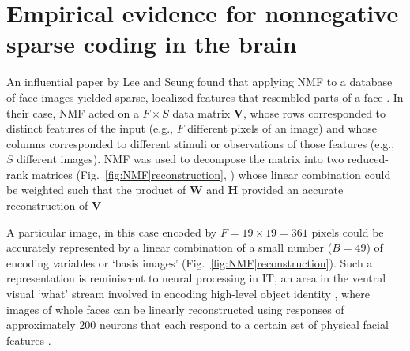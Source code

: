 \section*{Empirical evidence for nonnegative sparse coding in the brain}


An influential paper by Lee and Seung \cite{LeeSeung1999}
found that applying \ac{NMF} to a database of face images
yielded sparse, localized features that resembled parts of a face
.
In their case, \ac{NMF} acted on a
$F \times S$ data matrix \textbf{V},
whose rows corresponded to distinct features of the input 
(e.g., $F$ different pixels of an image)
and whose columns corresponded to different stimuli or 
observations of those features
(e.g., $S$ different images).
\ac{NMF} was used to decompose the matrix into two reduced-rank matrices
(Fig.~\ref{fig:NMF|reconstruction}, )
whose linear combination could be weighted such that the product of \textbf{W} and \textbf{H} provided an accurate reconstruction of \textbf{V}

A particular image, in this case encoded by $F = 19 \times 19 = 361$ pixels
could be accurately represented by a linear combination of 
a small number ($B = 49$) of encoding variables or `basis images'
(Fig.~\ref{fig:NMF|reconstruction}).
Such a representation is reminiscent to neural processing in \ac{IT},
an area in the ventral visual `what' stream
involved in encoding high-level object identity
\cite{BrincatConnor2004,Majaj2015},
where images of whole faces can be linearly reconstructed
using responses of approximately $200$ neurons
that each respond to a certain set of physical facial features
\cite{ChangTsao2017}.

